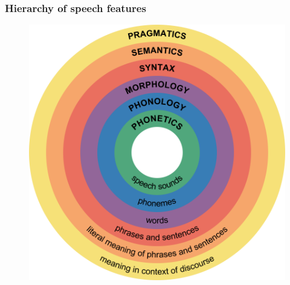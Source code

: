 \begin{frame}
    \frametitle{Hierarchy of speech features}
    \begin{figure}
        \centering
        \includegraphics[height=\textheight]{figures/Major_levels_of_linguistic_structure.png}
    \end{figure}
\end{frame}


